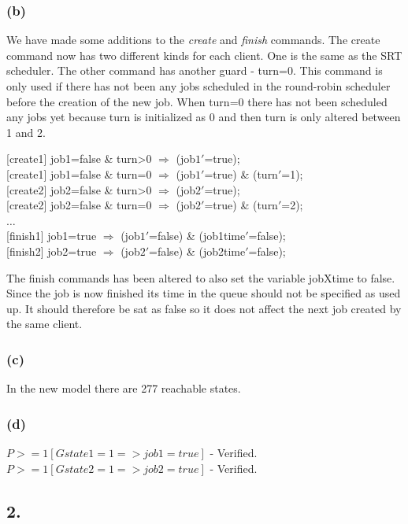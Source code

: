 \documentclass[12pt]{report}
\begin{document}
\subsubsection*{(b)}
We have made some additions to the \emph{create} and \emph{finish} commands. The create command now has two different kinds for each client. One is the same as the SRT scheduler. The other command has another guard - turn=0. This command is only used if there has not been any jobs scheduled in the round-robin scheduler before the creation of the new job. When turn=0 there has not been scheduled any jobs yet because turn is initialized as 0 and then turn is only altered between 1 and 2.
\begin{center}
{[create1]} job1=false \& turn>0 $\Rightarrow$ (job$1'$=true);\\
{[create1]} job1=false \& turn=0 $\Rightarrow$ (job$1'$=true) \& (turn$'$=1);\\
{[create2]} job2=false \& turn>0 $\Rightarrow$ (job$2'$=true);\\
{[create2]} job2=false \& turn=0 $\Rightarrow$ (job$2'$=true) \& (turn$'$=2);\\
$\dots$\\
{[finish1]} job1=true $\Rightarrow$ (job$1'$=false) \& (job1time$'$=false);\\
{[finish2]} job2=true $\Rightarrow$ (job$2'$=false) \& (job2time$'$=false);
\end{center}
The finish commands has been altered to also set the variable jobXtime to false. Since the job is now finished its time in the queue should not be specified as used up. It should therefore be sat as false so it does not affect the next job created by the same client.
\subsubsection*{(c)}
In the new model there are 277 reachable states.
\subsubsection*{(d)}
$P>=1 [G state1=1=>job1=true]$ - Verified.\\
$P>=1 [G state2=1=>job2=true]$ - Verified.

\subsection*{2.}
\end{document}
